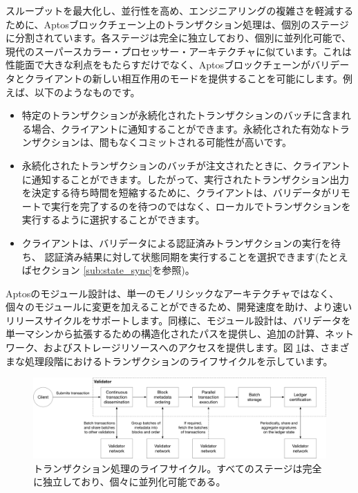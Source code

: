 \documentclass{article}
\begin{document}
スループットを最大化し、並行性を高め、エンジニアリングの複雑さを軽減するために、Aptosブロックチェーン上のトランザクション処理は、個別のステージに分割されています。各ステージは完全に独立しており、個別に並列化可能で、現代のスーパースカラー・プロセッサー・アーキテクチャに似ています。これは性能面で大きな利点をもたらすだけでなく、Aptosブロックチェーンがバリデータとクライアントの新しい相互作用のモードを提供することを可能にします。例えば、以下のようなものです。
\begin{itemize}
 \item 特定のトランザクションが永続化されたトランザクションのバッチに含まれる場合、クライアントに通知することができます。永続化された有効なトランザクションは、間もなくコミットされる可能性が高いです。

 \item 永続化されたトランザクションのバッチが注文されたときに、クライアントに通知することができます。したがって、実行されたトランザクション出力を決定する待ち時間を短縮するために、クライアントは、バリデータがリモートで実行を完了するのを待つのではなく、ローカルでトランザクションを実行するように選択することができます。

 \item クライアントは、バリデータによる認証済みトランザクションの実行を待ち、 認証済み結果に対して状態同期を実行することを選択できます(たとえばセクション \ref{sub:state_sync}を参照)。

\end{itemize}

Aptosのモジュール設計は、単一のモノリシックなアーキテクチャではなく、個々のモジュールに変更を加えることができるため、開発速度を助け、より速いリリースサイクルをサポートします。同様に、モジュール設計は、バリデータを単一マシンから拡張するための構造化されたパスを提供し、追加の計算、ネットワーク、およびストレージリソースへのアクセスを提供します。図 \ref{fig:pipeline}は、さまざまな処理段階におけるトランザクションのライフサイクルを示しています。

\begin{figure}
\centering
\includegraphics[width=1.0\textwidth]{pipeline.pdf}
\caption{\label{fig:pipeline}トランザクション処理のライフサイクル。すべてのステージは完全に独立しており、個々に並列化可能である。}
\end{figure}
\end{document}

